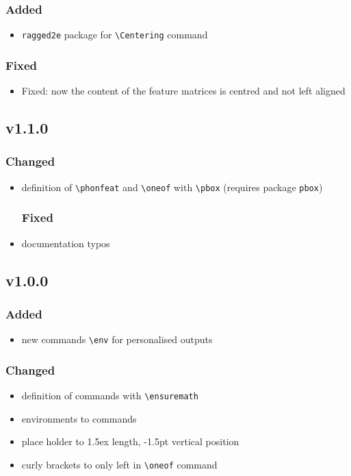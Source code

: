 \documentclass[a4paper]{article}
\begin{document}
\subsubsection*{Added}
\begin{itemize}
\item \texttt{ragged2e} package for \verb+\Centering+ command
\end{itemize}
\subsubsection*{Fixed}
\begin{itemize}
\item Fixed: now the content of the feature matrices is centred and not left aligned
\end{itemize}

\subsection*{v1.1.0}
\subsubsection*{Changed}
\begin{itemize}
\item definition of \verb+\phonfeat+ and \verb+\oneof+ with \verb+\pbox+ (requires package \texttt{pbox})
\subsubsection*{Fixed}
\item documentation typos
\end{itemize}

\subsection*{v1.0.0}
\subsubsection*{Added}
\begin{itemize}
\item new commands \verb|\env| for personalised outputs
\end{itemize}

\subsubsection*{Changed}
\begin{itemize}
\item definition of commands with \verb|\ensuremath|
\item environments to commands
\item place holder to 1.5ex length, -1.5pt vertical position
\item curly brackets to only left in \verb|\oneof| command
\end{itemize}
\end{document}
